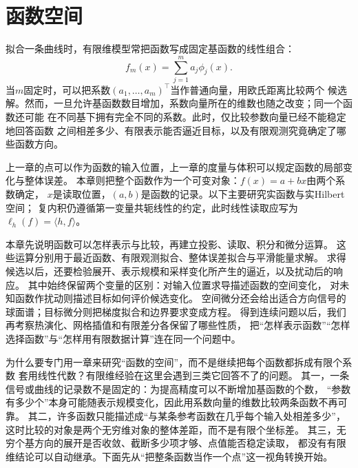 \chapter{函数空间}
\label{chap:functional-analysis-and-approximation}

\newcommand{\functionalinlinetablecaption}[2]{%
  \refstepcounter{table}\label{#1}%
  \addcontentsline{lot}{table}{\protect\numberline{\thetable}#2}%
  \par\smallskip\noindent
  {\figurefont\footnotesize
   \textcolor{BookTeal}{表~\thetable}\quad #2}\par}
\newcommand{\functionalinlinefigurecaption}[2]{%
  \refstepcounter{figure}\label{#1}%
  \addcontentsline{lof}{figure}{\protect\numberline{\thefigure}#2}%
  \par\smallskip\noindent
  {\figurefont\footnotesize
   \textcolor{BookTeal}{图~\thefigure}\quad #2}\par}

拟合一条曲线时，有限维模型常把函数写成固定基函数的线性组合：
\begin{equation}
  f_m(x)=\sum_{j=1}^{m}a_j\phi_j(x).
  \label{eq:functional-finite-basis-expansion}
\end{equation}
当$m$固定时，可以把系数$(a_1,\ldots,a_m)^{\top}$当作普通向量，用欧氏距离比较两个
候选解。然而，一旦允许基函数数目增加，系数向量所在的维数也随之改变；同一个函数还可能
在不同基下拥有完全不同的系数。此时，仅比较参数向量已经不能稳定地回答函数
之间相差多少、有限表示能否逼近目标，以及有限观测究竟确定了哪些函数方向。


上一章的点可以作为函数的输入位置，上一章的度量与体积可以规定函数的局部变化与整体误差。
本章则把整个函数作为一个可变对象：$f(x)=a+bx$由两个系数确定，
$x$是读取位置，$(a,b)$是函数的记录。以下主要研究实函数与实Hilbert空间；
复内积仍遵循第一变量共轭线性的约定，此时线性读取应写为$\ell_h(f)=\langle h,f\rangle$。

本章先说明函数可以怎样表示与比较，再建立投影、读取、积分和微分运算。
这些运算分别用于最近函数、有限观测拟合、整体误差拟合与平滑能量求解。
求得候选以后，还要检验展开、表示规模和采样变化所产生的逼近，以及扰动后的响应。
其中始终保留两个变量的区别：对输入位置求导描述函数的空间变化，
对未知函数作扰动则描述目标如何评价候选变化。
空间微分还会给出适合方向信号的球面谱；目标微分则把梯度拟合和边界要求变成方程。
得到连续问题以后，我们再考察热演化、网格插值和有限差分各保留了哪些性质，
把“怎样表示函数”“怎样选择函数”与“怎样用有限数据计算”连在同一个问题中。

为什么要专门用一章来研究“函数的空间”，而不是继续把每个函数都拆成有限个系数
套用线性代数？有限维经验在这里会遇到三类它回答不了的问题。
其一，一条信号或曲线的记录数不是固定的：为提高精度可以不断增加基函数的个数，
“参数有多少个”本身可能随表示规模变化，因此用系数向量的维数比较两条函数不再可靠。
其二，许多函数只能描述成“与某条参考函数在几乎每个输入处相差多少”，
这时比较的对象是两个无穷维对象的整体差距，而不是有限个坐标差。
其三，无穷个基方向的展开是否收敛、截断多少项才够、点值能否稳定读取，
都没有有限维结论可以自动继承。下面先从“把整条函数当作一个点”这一视角转换开始。
